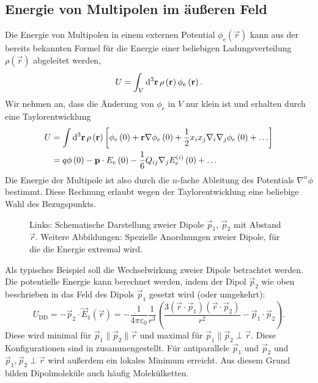 \subsection{Energie von Multipolen im äußeren Feld}

Die Energie von Multipolen in einem externen Potential $\phi _{e}\left(\vec {r}\right)$ kann aus der bereits bekannten Formel für die Energie einer beliebigen Ladungsverteilung $\rho \left(\vec {r}\right)$ abgeleitet werden,
\begin{equation*}
	U=\int _{V}\diffa[3]{\vec{r}}\rho \left(\vec {r}\right)\phi _{e}\left(\vec {r}\right).
\end{equation*}
Wir nehmen an, dass die Änderung von $\phi _{e}$ in $V$ nur klein ist und erhalten durch eine Taylorentwicklung
\begin{align*}
	U & =\int \diffa[3]{\vec{r}}\rho \left(\vec {r}\right)\left[\phi _{e}\left(0\right)+\vec {r}\nabla \phi _{e}\left(0\right)+\frac{1}{2}x_{i}x_{j}\nabla _{i}\nabla _{j}\phi _{e}\left(0\right)+\ldots \right] \\&=q\phi \left(0\right)-\vec {p}\cdot E_{e}\left(0\right)-\frac{1}{6}Q_{ij}\nabla _{j}E_{e}^{\left(i\right)}\left(0\right)+\ldots
\end{align*}
Die Energie der Multipole ist also durch die $n$-fache Ableitung des Potentials $\nabla ^{n}\phi $ bestimmt. Diese Rechnung erlaubt wegen der Taylorentwicklung eine beliebige Wahl des Bezugspunkts.

\begin{figure}[htb]
	\centering
	\tfigDipoles
	\caption{Links: Schematische Darstellung zweier Dipole $\vec p_1$, $\vec p_2$ mit Abstand $\vec r$. Weitere Abbildungen: Spezielle Anordnungen zweier Dipole, für die die Energie extremal wird. }
	\label{fig:dipoles}
\end{figure}

Als typisches Beispiel soll die Wechselwirkung zweier Dipole betrachtet werden. Die potentielle Energie kann berechnet werden, indem der Dipol $\vec {p}_{2}$ wie oben beschrieben in das Feld des Dipols $\vec {p}_{1}$ gesetzt wird (oder umgekehrt):
\begin{equation*}
	U_{\mathrm{DD}}=-\vec {p}_{2}\cdot \vec {E}_{1}\left(\vec {r}\right)=-\frac{1}{4\pi \varepsilon _{0}}\frac{1}{r^{3}}\left(\frac{3\left(\vec {r}\cdot \vec {p}_{1}\right)\left(\vec {r}\cdot \vec {p}_{2}\right)}{r^{2}}-\vec {p}_{1}\cdot \vec {p}_{2}\right).
\end{equation*}
Diese wird minimal für $\vec {p}_{1}\parallel \vec {p}_{2}\parallel \vec {r}$ und maximal für $\vec {p}_{1}\parallel \vec {p}_{2}\perp \vec {r}$. Diese Konfigurationen sind in  zusammengestellt. Für antiparallele $\vec {p}_{1}$ und $\vec {p}_{2}$ und $\vec {p}_{1},\vec {p}_{2}\perp \vec {r}$ wird außerdem ein lokales Minimum erreicht. Aus diesem Grund bilden Dipolmoleküle auch häufig Molekülketten.

